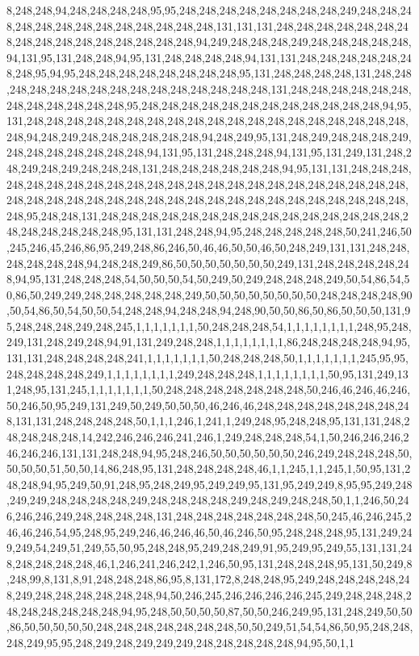 8,248,248,94,248,248,248,248,95,95,248,248,248,248,248,248,248,248,249,248,248,248,248,248,248,248,248,248,248,248,248,248,131,131,131,248,248,248,248,248,248,248,248,248,248,248,248,248,248,248,248,94,249,248,248,248,249,248,248,248,248,248,94,131,95,131,248,248,94,95,131,248,248,248,248,94,131,131,248,248,248,248,248,248,248,95,94,95,248,248,248,248,248,248,248,248,95,131,248,248,248,248,131,248,248,248,248,248,248,248,248,248,248,248,248,248,248,248,131,248,248,248,248,248,248,248,248,248,248,248,248,95,248,248,248,248,248,248,248,248,248,248,248,248,94,95,131,248,248,248,248,248,248,248,248,248,248,248,248,248,248,248,248,248,248,248,248,94,248,249,248,248,248,248,248,248,94,248,249,95,131,248,249,248,248,248,249,248,248,248,248,248,248,248,94,131,95,131,248,248,248,94,131,95,131,249,131,248,248,249,248,249,248,248,248,131,248,248,248,248,248,248,94,95,131,131,248,248,248,248,248,248,248,248,248,248,248,248,248,248,248,248,248,248,248,248,248,248,248,248,248,248,248,248,248,248,248,248,248,248,248,248,248,248,248,248,248,248,248,248,95,248,248,131,248,248,248,248,248,248,248,248,248,248,248,248,248,248,248,248,248,248,248,248,248,95,131,131,248,248,94,95,248,248,248,248,248,50,241,246,50,245,246,45,246,86,95,249,248,86,246,50,46,46,50,50,46,50,248,249,131,131,248,248,248,248,248,248,94,248,248,249,86,50,50,50,50,50,50,50,249,131,248,248,248,248,248,94,95,131,248,248,248,54,50,50,50,54,50,249,50,249,248,248,248,249,50,54,86,54,50,86,50,249,249,248,248,248,248,248,249,50,50,50,50,50,50,50,50,248,248,248,248,90,50,54,86,50,54,50,50,54,248,248,94,248,248,94,248,90,50,50,86,50,86,50,50,50,131,95,248,248,248,249,248,245,1,1,1,1,1,1,1,50,248,248,248,54,1,1,1,1,1,1,1,1,248,95,248,249,131,248,249,248,94,91,131,249,248,248,1,1,1,1,1,1,1,1,86,248,248,248,248,94,95,131,131,248,248,248,248,241,1,1,1,1,1,1,1,50,248,248,248,50,1,1,1,1,1,1,1,245,95,95,248,248,248,248,249,1,1,1,1,1,1,1,1,249,248,248,248,1,1,1,1,1,1,1,1,50,95,131,249,131,248,95,131,245,1,1,1,1,1,1,1,50,248,248,248,248,248,248,248,50,246,46,246,46,246,50,246,50,95,249,131,249,50,249,50,50,50,46,246,46,248,248,248,248,248,248,248,248,131,131,248,248,248,248,50,1,1,1,246,1,241,1,249,248,95,248,248,95,131,131,248,248,248,248,248,14,242,246,246,246,241,246,1,249,248,248,248,54,1,50,246,246,246,246,246,246,131,131,248,248,94,95,248,246,50,50,50,50,50,50,246,249,248,248,248,50,50,50,50,51,50,50,14,86,248,95,131,248,248,248,248,46,1,1,245,1,1,245,1,50,95,131,248,248,94,95,249,50,91,248,95,248,249,95,249,249,95,131,95,249,249,8,95,95,249,248,249,249,248,248,248,248,249,248,248,248,248,249,248,249,248,248,50,1,1,246,50,246,246,246,249,248,248,248,248,131,248,248,248,248,248,248,248,50,245,46,246,245,246,46,246,54,95,248,95,249,246,46,246,46,50,46,246,50,95,248,248,248,95,131,249,249,249,54,249,51,249,55,50,95,248,248,95,249,248,249,91,95,249,95,249,55,131,131,248,248,248,248,248,46,1,246,241,246,242,1,246,50,95,131,248,248,248,95,131,50,249,8,248,99,8,131,8,91,248,248,248,86,95,8,131,172,8,248,248,95,249,248,248,248,248,248,249,248,248,248,248,248,248,94,50,246,245,246,246,246,246,245,249,248,248,248,248,248,248,248,248,248,94,95,248,50,50,50,50,87,50,50,246,249,95,131,248,249,50,50,86,50,50,50,50,50,248,248,248,248,248,248,248,50,50,249,51,54,54,86,50,95,248,248,248,249,95,95,248,249,248,249,249,249,248,248,248,248,248,94,95,50,1,1